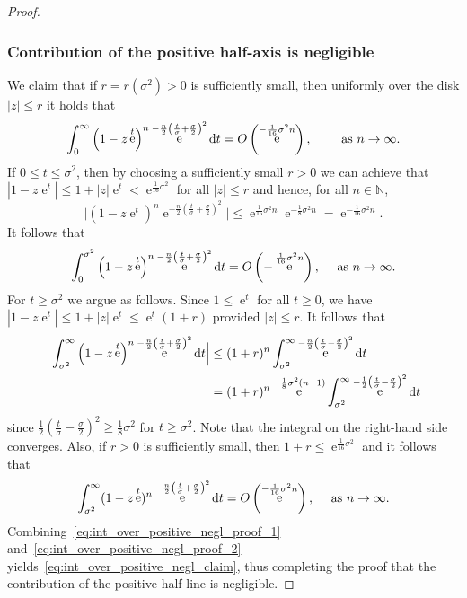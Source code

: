 \documentclass[AHL,Unicode,longabstracts,published]{cedram}
\DeclareMathOperator{\eee}{e}
\newcommand{\N}{\mathbb{N}}
\newcommand*\dint{\text{\normalfont d}}
\begin{document}
\begin{proof}
\subsubsection*{Contribution of the positive half-axis is negligible}
We claim that if $r = r(\sigma^2)>0$ is sufficiently small, then uniformly over the disk $|z|\leq r$ it holds that
\begin{equation}\label{eq:int_over_positive_negl_claim}
\int_0^\infty \left(1 - z\eee^t\right)^n \eee^{-\frac n2 \left(\frac{t}{\sigma} + \frac \sigma 2\right)^2} \dint t = O\left(\eee^{ - \frac{1} {16} \sigma^2 n}\right),
\qquad
\text{ as } n \to\infty.
\end{equation}
If $0\leq t \leq \sigma^2$, then by choosing a sufficiently small $r>0$ we can achieve that $|1 - z\eee^t|\leq 1 + |z|\eee^t < \eee^{\frac 1 {16}\sigma^2}$ for all $|z|\leq r$ and hence, for all $n\in \N$,
\[
\Big |\left(1 - z\eee^t\right)^n \eee^{-\frac n2 \left(\frac{t}{\sigma} + \frac \sigma 2\right)^2}\Big |
\leq
\eee^{\frac{1}{16} \sigma^2 n} \eee^{- \frac {1}{8}\sigma^2 n} =
\eee^{-\frac{1}{16} \sigma^2 n}.
\]
It follows that
\begin{equation}\label{eq:int_over_positive_negl_proof_1}
\int_0^{\sigma^2} \left(1 - z\eee^t\right)^n \eee^{-\frac n2 \left(\frac{t}{\sigma} + \frac \sigma 2\right)^2} \dint t =O\left(-\eee^{\frac 1 {16}\sigma^2 n}\right),
\quad
\text{ as } n\to\infty.
\end{equation}
For $t\geq \sigma^2$ we argue as follows. Since $1\leq \eee^t$ for all $t\geq 0$, we have $|1 - z \eee^t|\leq 1 + |z|\eee^t \leq \eee^t (1+r)$ provided $|z|\leq r$. It follows that
\begin{align*}
\Big | \int_{\sigma^2}^\infty \left(1 - z\eee^t\right)^n \eee^{-\frac n2 \left(\frac{t}{\sigma} + \frac \sigma 2\right)^2} \dint t \Big|
&\leq (1+r)^n \int_{\sigma^2}^\infty \eee^{-\frac n2 \left(\frac{t}{\sigma} - \frac \sigma 2\right)^2} \dint t \\
&= (1+r)^n \eee^{-\frac 1 8 \sigma^2 (n-1)} \int_{\sigma^2}^\infty \eee^{-\frac 12 \left(\frac{t}{\sigma} - \frac \sigma 2\right)^2} \dint t
\end{align*}
since $\frac 1 2 (\frac{t}{\sigma} - \frac \sigma 2)^2 \geq \frac 18 \sigma^2$ for $t\geq \sigma^2$. Note that the integral on the right-hand side converges. Also, if $r>0$ is sufficiently small, then $1+ r \leq \eee^{\frac 1 {16} \sigma^2}$ and it follows that
\begin{equation}\label{eq:int_over_positive_negl_proof_2}
\int_{\sigma^2}^\infty (1 - z\eee^t)^n \eee^{-\frac n2 \left(\frac{t}{\sigma} + \frac \sigma 2\right)^2} \dint t = O\left(\eee^{ -\frac 1 {16} \sigma^2 n}\right),
\quad
\text{ as } n\to\infty.
\end{equation}
Combining~\eqref{eq:int_over_positive_negl_proof_1} and~\eqref{eq:int_over_positive_negl_proof_2} yields~\eqref{eq:int_over_positive_negl_claim}, thus completing the proof that the contribution of the positive half-line is negligible.


\end{proof}
\end{document}
